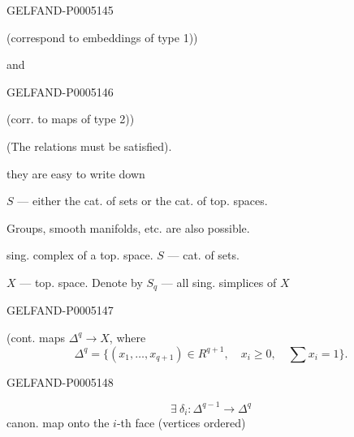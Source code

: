\begin{GelfandAdjacentEvidence}{GELFAND-P000514}{5}

(correspond to embeddings of type 1))

and
\end{GelfandAdjacentEvidence}
\begin{GelfandAdjacentEvidence}{GELFAND-P000514}{6}

(corr. to maps of type 2))

(The relations must be satisfied).

\hspace*{3em}they are easy to write down

$S$ — either the cat. of sets or the cat. of top. spaces.

Groups, smooth manifolds, etc. are also possible.

 sing. complex of a top. space. $S$ — cat. of sets.

$X$ — top. space. Denote by $S_q$ — all sing. simplices of $X$
\end{GelfandAdjacentEvidence}
\begin{GelfandAdjacentEvidence}{GELFAND-P000514}{7}


(cont. maps $\Delta^q\to X$, where
\[
\Delta^q=\{(x_1,\ldots,x_{q+1})\in R^{q+1},\quad x_i\geq0,\quad\sum x_i=1\}.
\]
\end{GelfandAdjacentEvidence}
\begin{GelfandAdjacentEvidence}{GELFAND-P000514}{8}


\[
\exists\ \delta_i:\Delta^{q-1}\longrightarrow\Delta^q
\]
canon. map onto the $i$-th face (vertices ordered)
\end{GelfandAdjacentEvidence}
